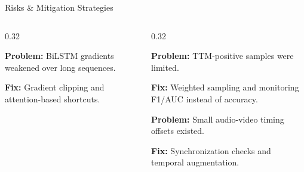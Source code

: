 \documentclass[aspectratio=169, 10pt]{beamer}
\begin{document}
\begin{frame}{Risks \& Mitigation Strategies}
\begin{columns}[T,onlytextwidth]
\begin{column}{0.32\textwidth}
\begin{tcolorbox}[
purplecard,
title={\small Gradient Vanishing},
boxsep=1pt,
left=2pt,right=2pt,
top=2pt,bottom=2pt]

\footnotesize
\textbf{Problem:}
BiLSTM gradients weakened over long sequences.

\textbf{Fix:}
Gradient clipping and attention-based shortcuts.

\end{tcolorbox}

\end{column}

\begin{column}{0.32\textwidth}

\begin{tcolorbox}[
orangecard,
title={\small Class Imbalance},
boxsep=1pt,
left=2pt,right=2pt,
top=2pt,bottom=2pt]

\footnotesize
\textbf{Problem:}
TTM-positive samples were limited.

\textbf{Fix:}
Weighted sampling and monitoring F1/AUC instead of accuracy.

\end{tcolorbox}

\vspace{2pt}

\begin{tcolorbox}[
tealcard,
title={\small Audio-Visual Sync},
boxsep=1pt,
left=2pt,right=2pt,
top=2pt,bottom=2pt]

\footnotesize
\textbf{Problem:}
Small audio-video timing offsets existed.

\textbf{Fix:}
Synchronization checks and temporal augmentation.

\end{tcolorbox}

\end{column}

\end{columns}

\end{frame}
\end{document}
